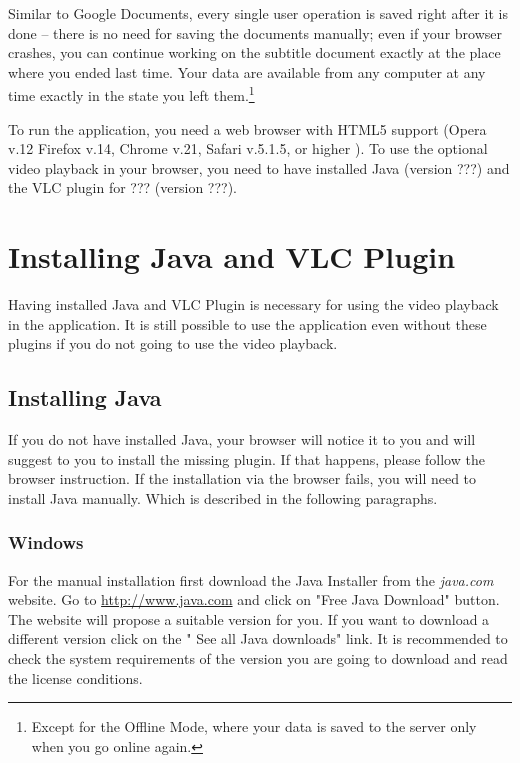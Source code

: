 Similar to Google Documents, every single user operation is saved right after it is done -- there is no need for saving the documents manually; even if your browser crashes, you can continue working on the subtitle document exactly at the place where you ended last time. Your data are available from any computer at any time exactly in the state you left them.\footnote{Except for the Offline Mode, where your data is saved to the server only when you go online again.}

To run the application, you need a web browser with HTML5 support (Opera v.12
Firefox v.14, Chrome v.21, Safari v.5.1.5, or higher ). To use the optional video playback in your browser, you need to have installed Java (version ???) and the VLC plugin for ??? (version ???).

\section{Installing Java and VLC Plugin}

Having installed Java and VLC Plugin is necessary for using the video playback in the application. It is still possible to use the application even without these plugins if you do not going to use the video playback.

\subsection{Installing Java}

If you do not have installed Java, your browser will notice it to you and will suggest to you to install the missing plugin. If that happens, please follow the browser instruction. If the installation via the browser fails, you will need to install Java manually. Which is described in the following paragraphs.

\subsubsection{Windows}

For the manual installation first download the Java Installer from the \emph{java.com} website. Go to \url{http://www.java.com} and click on "Free Java Download" button. The website will propose a suitable version for you. If you want to download a different version click on the " See all Java downloads" link. It is recommended to check the system requirements of the version you are going to download and read the license conditions.

